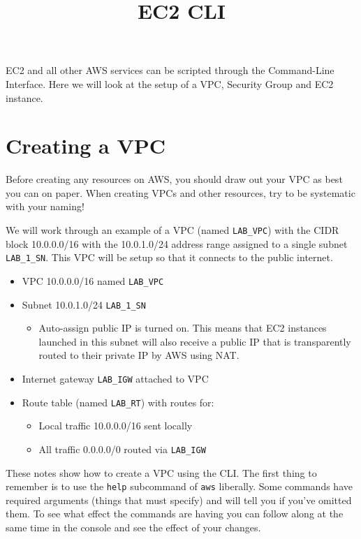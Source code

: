 \documentclass{pgnotes}
\title{EC2 CLI}
\begin{document}
\maketitle

EC2 and all other AWS services can be scripted through the Command-Line Interface.
Here we will look at the setup of a VPC, Security Group and EC2 instance.

\section{Creating a VPC}\label{creating-a-vpc}

Before creating any resources on AWS, you should draw out your VPC as
best you can on paper. When creating VPCs and other resources, try to be
systematic with your naming!

We will work through an example of a VPC (named \texttt{LAB\_VPC}) with
the CIDR block 10.0.0.0/16 with the 10.0.1.0/24 address range assigned
to a single subnet \texttt{LAB\_1\_SN}. This VPC will be setup so that
it connects to the public internet.

\begin{itemize}
\item
  VPC 10.0.0.0/16 named \texttt{LAB\_VPC}
\item
  Subnet 10.0.1.0/24 \texttt{LAB\_1\_SN}

  \begin{itemize}
  
  \item
    Auto-assign public IP is turned on. This means that EC2 instances
    launched in this subnet will also receive a public IP that is
    transparently routed to their private IP by AWS using NAT.
  \end{itemize}
\item
  Internet gateway \texttt{LAB\_IGW} attached to VPC
\item
  Route table (named \texttt{LAB\_RT}) with routes for:

  \begin{itemize}
  \item
    Local traffic 10.0.0.0/16 sent locally
  \item
    All traffic 0.0.0.0/0 routed via \texttt{LAB\_IGW}
  \end{itemize}
\end{itemize}

These notes show how to create a VPC using the CLI. The first thing to
remember is to use the \texttt{help} subcommand of \texttt{aws}
liberally. Some commands have required arguments (things that must
specify) and will tell you if you've omitted them. To see what effect
the commands are having you can follow along at the same time in the
console and see the effect of your changes.
\end{document}
